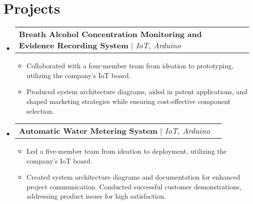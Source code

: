 \documentclass[letterpaper,11pt]{article}
\makeatletter
\newcommand{\resumeItem}[1]{
  \item\small{
    {#1 \vspace{-2pt}}
  }
}
\newcommand{\resumeSubheading}[4]{
  \vspace{-2pt}\item
    \begin{tabular*}{1.0\textwidth}[t]{l@{\extracolsep{\fill}}r}
      \textbf{#1} & \textbf{\small #2} \\
      \textit{\small#3} & \textit{\small #4} \\
    \end{tabular*}\vspace{-7pt}
}
\newcommand{\resumeProjectHeading}[2]{
    \item
    \begin{tabular*}{1.001\textwidth}{l@{\extracolsep{\fill}}r}
      \small#1 & \textbf{\small #2}\\
    \end{tabular*}\vspace{-7pt}
}
\newcommand{\resumeSubHeadingListStart}{\begin{itemize}[leftmargin=0.0in, label={}]}
\newcommand{\resumeSubHeadingListEnd}{\end{itemize}}
\newcommand{\resumeItemListStart}{\begin{itemize}}
\newcommand{\resumeItemListEnd}{\end{itemize}\vspace{-5pt}}
\makeatother
\begin{document}
\section{Projects}
\vspace{-5pt}
\resumeSubHeadingListStart
\resumeProjectHeading
{\textbf{Breath Alcohol Concentration Monitoring and Evidence Recording System} $|$ \emph{IoT, Arduino}}{}
\resumeItemListStart
\resumeItem{Collaborated with a four-member team from ideation to prototyping, utilizing the company's IoT board.}
\resumeItem{Produced system architecture diagrams, aided in patent applications, and shaped marketing strategies while ensuring cost-effective component selection.}
\resumeItemListEnd
\vspace{-13pt}
\resumeProjectHeading
{\textbf{Automatic Water Metering System} $|$ \emph{IoT, Arduino}}{}
\resumeItemListStart
\resumeItem{Led a five-member team from ideation to deployment, utilizing the company's IoT board.}
\resumeItem{Created system architecture diagrams and documentation for enhanced project communication. Conducted successful customer demonstrations, addressing product issues for high satisfaction.}
\resumeItemListEnd
\resumeSubHeadingListEnd
\vspace{-5pt}

%


\end{document}

